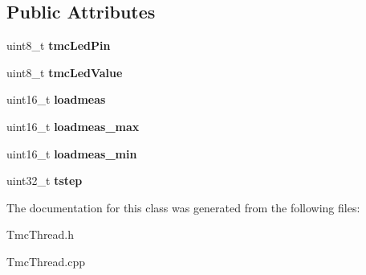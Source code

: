 \subsection*{Public Attributes}
\begin{DoxyCompactItemize}
\item 
\hypertarget{classfirestep_1_1_tmc_thread_acf160b2ffe709639e8caaf8320bf5b00}{uint8\+\_\+t {\bfseries tmc\+Led\+Pin}}\label{classfirestep_1_1_tmc_thread_acf160b2ffe709639e8caaf8320bf5b00}

\item 
\hypertarget{classfirestep_1_1_tmc_thread_ab54cefd6ad811806cde581daf170704b}{uint8\+\_\+t {\bfseries tmc\+Led\+Value}}\label{classfirestep_1_1_tmc_thread_ab54cefd6ad811806cde581daf170704b}

\item 
\hypertarget{classfirestep_1_1_tmc_thread_a6c43133b36e318002ef0d41d35e8ee6c}{uint16\+\_\+t {\bfseries loadmeas}}\label{classfirestep_1_1_tmc_thread_a6c43133b36e318002ef0d41d35e8ee6c}

\item 
\hypertarget{classfirestep_1_1_tmc_thread_a78d09c196ac6ed2464e948a8720a5ead}{uint16\+\_\+t {\bfseries loadmeas\+\_\+max}}\label{classfirestep_1_1_tmc_thread_a78d09c196ac6ed2464e948a8720a5ead}

\item 
\hypertarget{classfirestep_1_1_tmc_thread_a2c1371eb935aeb4c5fce044e17420c45}{uint16\+\_\+t {\bfseries loadmeas\+\_\+min}}\label{classfirestep_1_1_tmc_thread_a2c1371eb935aeb4c5fce044e17420c45}

\item 
\hypertarget{classfirestep_1_1_tmc_thread_a6cc2118ff1e2d38dd0eae127c5dee960}{uint32\+\_\+t {\bfseries tstep}}\label{classfirestep_1_1_tmc_thread_a6cc2118ff1e2d38dd0eae127c5dee960}

\end{DoxyCompactItemize}


The documentation for this class was generated from the following files\+:\begin{DoxyCompactItemize}
\item 
Tmc\+Thread.\+h\item 
Tmc\+Thread.\+cpp\end{DoxyCompactItemize}
